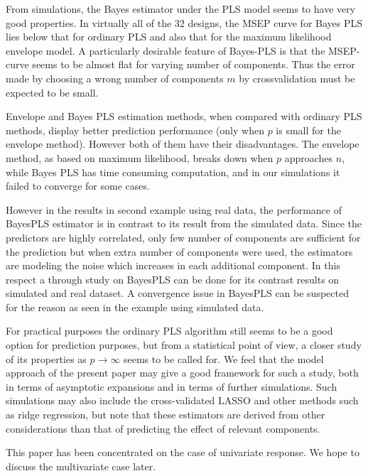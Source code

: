 \documentclass[num-refs]{wiley-article}
\begin{document}
From simulations, the Bayes estimator under the PLS model seems to have very good properties. In virtually all of the 32 designs, the MSEP curve for Bayes PLS lies below that for ordinary PLS and also that for the maximum likelihood envelope model. A particularly desirable feature of Bayes-PLS is that the MSEP-curve seems to be almost flat for varying number of components. Thus the error made by choosing a wrong number of components $m$ by crossvalidation must be expected to be small.

Envelope and Bayes PLS estimation methods, when compared with ordinary PLS methods, display better prediction performance (only when $p$ is small for the envelope method). However both of them have their disadvantages. The envelope method, as based on maximum likelihood, breaks down when $p$ approaches $n$, while Bayes PLS has time consuming computation, and in our simulations it failed to converge for some cases.

However in the results in second example using real data, the performance of BayesPLS estimator is in contrast to its result from the simulated data. Since the predictors are highly correlated, only few number of components are sufficient for the prediction but when extra number of components were used, the estimators are modeling the noise which increases in each additional component. In this respect a through study on BayesPLS can be done for its contrast results on simulated and real dataset. A convergence issue in BayesPLS can be suspected for
the reason as seen in the example using simulated data.

For practical purposes the ordinary PLS algorithm still seems to be a good option for prediction purposes, but from a statistical point of view, a closer study of its properties as $p\rightarrow\infty$ seems to be called for. We feel that the model approach of the present paper may give a good framework for such a study, both in terms of asymptotic expansions and in terms of further simulations. Such simulations may also include the cross-validated LASSO and other methods such as ridge regression, but note that these estimators are derived from other considerations than that of predicting the effect of relevant components.

This paper has been concentrated on the case of univariate response. We hope to discuss the multivariate case later.



\end{document}
